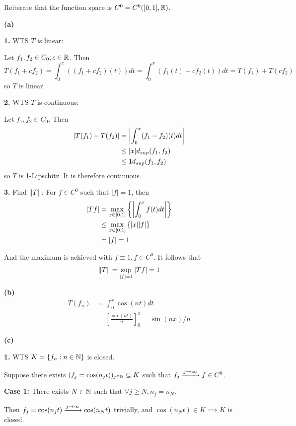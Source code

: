 \documentclass[a4paper, 12pt]{article}
\begin{document}
\begin{solution}
    Reiterate that the function space is $C^0 = C^0([0, 1], \bbr)$.

    \textbf{(a)}

    \textbf{1.} WTS $T$ is linear:

    Let $f_1, f_2 \in C_0; c \in \bbr$. Then \[
        T(f_1 + cf_2) = \int_{0}^{x}((f_1 + cf_2)(t)) dt = \int_{0}^{x}(f_1(t) + cf_2(t)) dt = T(f_1) + T(cf_2)
    \]
    so $T$ is linear.

    \textbf{2.} WTS $T$ is continuous:

    Let $f_1, f_2 \in C_0$. Then
    \begin{align*}
        |T(f_1) - T(f_2)| & = \abs*{\int_{0}^{x} (f_1 - f_2)(t) dt} \\
                          & \leq |x| d_{sup}(f_1, f_2)              \\
                          & \leq 1 d_{sup}(f_1, f_2)
    \end{align*}
    so $T$ is 1-Lipschitz. It is therefore continuous.

    \textbf{3.} Find $\norm{T}$:
    For $f \in C^0$ such that $|f| = 1$, then
    \begin{align*}
        |Tf| & = \max_{x \in [0, 1]}\left\{\abs*{\int_{0}^{x}f(t)dt}\right\} \\
             & \leq \max_{x \in [0, 1]}\left\{|x| |f|\right\}                \\
             & = |f| = 1
    \end{align*}

    And the maximum is achieved with $f \equiv 1, f \in C^0$. It follows that \[
        \norm{T} = \sup_{|f| = 1}|Tf| = 1
    \]

    \textbf{(b)}
    \begin{align*}
        T(f_n) & = \int_{0}^{x} \cos(nt) dt                             \\
               & = \left[\frac{\sin(nt)}{n}\right]^{x}_{0} = \sin(nx)/n
    \end{align*}

    \textbf{(c)}

    \textbf{1.} WTS $K = \{f_n : n \in \bbn\}$ is closed.

    Suppose there exists $(f_j = \cos(n_j t))_{j \in \bbn} \subseteq K$ such that $f_j \cvgj f \in C^0$.

    \textbf{Case 1: } There exists $N \in \bbn$ such that $\forall j \geq N, n_j = n_N$.

    Then $f_j = \cos (n_j t) \cvgj \cos(n_N t)$ trivially, and $\cos (n_N t) \in K \implies K$ is closed.


\end{solution}
\end{document}
